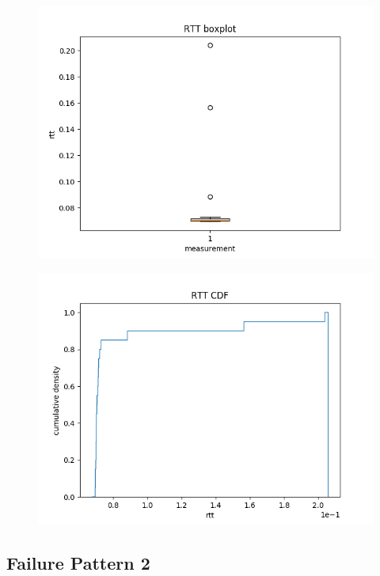 \documentclass{article}
\begin{document}
\begin{figure}[h] \label{usrp-fails-2}
	\includegraphics[width=\textwidth]{usrp_fail_rtt_boxplot}
\end{figure}

\begin{figure}[h] \label{usrp-fails-3}
	\includegraphics[width=\textwidth]{usrp_fail_rtt_cdf}
\end{figure}

\clearpage

\subsection{Failure Pattern 2}
\end{document}
